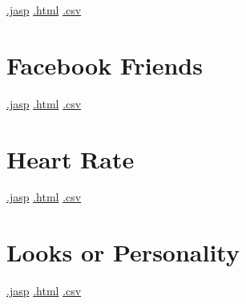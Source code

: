 \documentclass[
  letterpaper,
  DIV=11,
  numbers=noendperiod]{scrreprt}
\begin{document}
\textbar{}
\href{https://github.com/jasp-stats/jasp-data-library/raw/main/Erotic\%20Pictures\%20and\%20Love/Erotic\%20Pictures\%20and\%20Love.jasp}{.jasp}
\textbar{}
\href{https://htmlpreview.github.io/?https://github.com/jasp-stats/jasp-data-library/blob/main/Erotic\%20Pictures\%20and\%20Love/index.html}{.html}
\textbar{}
\href{https://raw.githubusercontent.com/jasp-stats/jasp-data-library/main/Erotic\%20Pictures\%20and\%20Love/Erotic\%20Pictures\%20and\%20Love.csv}{.csv}

\hypertarget{facebook-friends}{%
\section{Facebook Friends}\label{facebook-friends}}

\textbar{}
\href{https://github.com/jasp-stats/jasp-data-library/raw/main/Facebook\%20Friends/Facebook\%20Friends.jasp}{.jasp}
\textbar{}
\href{https://htmlpreview.github.io/?https://github.com/jasp-stats/jasp-data-library/blob/main/Facebook\%20Friends/index.html}{.html}
\textbar{}
\href{https://raw.githubusercontent.com/jasp-stats/jasp-data-library/main/Facebook\%20Friends/Facebook\%20Friends.csv}{.csv}

\hypertarget{heart-rate}{%
\section{Heart Rate}\label{heart-rate}}

\textbar{}
\href{https://github.com/jasp-stats/jasp-data-library/raw/main/Heart\%20Rate/Heart\%20Rate.jasp}{.jasp}
\textbar{}
\href{https://htmlpreview.github.io/?https://github.com/jasp-stats/jasp-data-library/blob/main/Heart\%20Rate/index.html}{.html}
\textbar{}
\href{https://raw.githubusercontent.com/jasp-stats/jasp-data-library/main/Heart\%20Rate/Heart\%20Rate.csv}{.csv}

\hypertarget{looks-or-personality}{%
\section{Looks or Personality}\label{looks-or-personality}}

\textbar{}
\href{https://github.com/jasp-stats/jasp-data-library/raw/main/Looks\%20or\%20Personality/Looks\%20or\%20Personality.jasp}{.jasp}
\textbar{}
\href{https://htmlpreview.github.io/?https://github.com/jasp-stats/jasp-data-library/blob/main/Looks\%20or\%20Personality/index.html}{.html}
\textbar{}
\href{https://raw.githubusercontent.com/jasp-stats/jasp-data-library/main/Looks\%20or\%20Personality/Looks\%20or\%20Personality.csv}{.csv}
\end{document}
